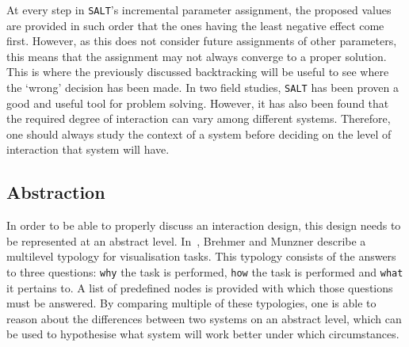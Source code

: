 At every step in \verb|SALT|'s incremental parameter assignment, the proposed values are provided in such order that the ones having the least negative effect come first. However, as this does not consider future assignments of other parameters, this means that the assignment may not always converge to a proper solution. This is where the previously discussed backtracking will be useful to see where the `wrong' decision has been made. In two field studies, \verb|SALT| has been proven a good and useful tool for problem solving. However, it has also been found that the required degree of interaction can vary among different systems. Therefore, one should always study the context of a system before deciding on the level of interaction that system will have.



\subsection{Abstraction}
In order to be able to properly discuss an interaction design, this design needs to be represented at an abstract level. In~\cite{brehmer2013multi}, Brehmer and Munzner describe a multilevel typology for visualisation tasks. This typology consists of the answers to three questions: \verb|why| the task is performed, \verb|how| the task is performed and \verb|what| it pertains to. A list of predefined nodes is provided with which those questions must be answered. By comparing multiple of these typologies, one is able to reason about the differences between two systems on an abstract level, which can be used to hypothesise what system will work better under which circumstances.


